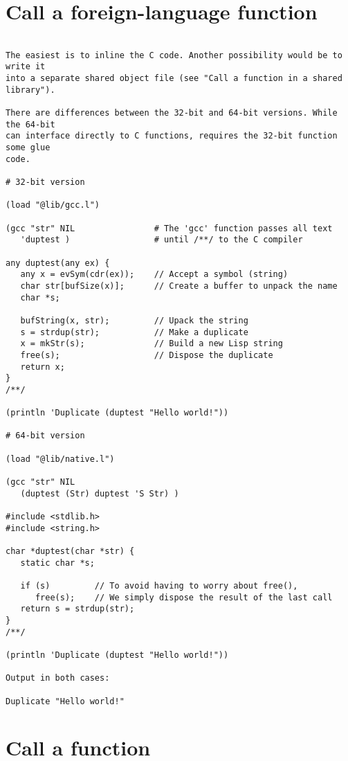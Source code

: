 \section*{Call a foreign-language function}

\begin{verbatim}

The easiest is to inline the C code. Another possibility would be to write it
into a separate shared object file (see "Call a function in a shared library").

There are differences between the 32-bit and 64-bit versions. While the 64-bit
can interface directly to C functions, requires the 32-bit function some glue
code.

# 32-bit version

(load "@lib/gcc.l")

(gcc "str" NIL                # The 'gcc' function passes all text
   'duptest )                 # until /**/ to the C compiler

any duptest(any ex) {
   any x = evSym(cdr(ex));    // Accept a symbol (string)
   char str[bufSize(x)];      // Create a buffer to unpack the name
   char *s;

   bufString(x, str);         // Upack the string
   s = strdup(str);           // Make a duplicate
   x = mkStr(s);              // Build a new Lisp string
   free(s);                   // Dispose the duplicate
   return x;
}
/**/

(println 'Duplicate (duptest "Hello world!"))

# 64-bit version

(load "@lib/native.l")

(gcc "str" NIL
   (duptest (Str) duptest 'S Str) )

#include <stdlib.h>
#include <string.h>

char *duptest(char *str) {
   static char *s;

   if (s)         // To avoid having to worry about free(),
      free(s);    // We simply dispose the result of the last call
   return s = strdup(str);
}
/**/

(println 'Duplicate (duptest "Hello world!"))

Output in both cases:

Duplicate "Hello world!"

\end{verbatim}

\section*{Call a function}

